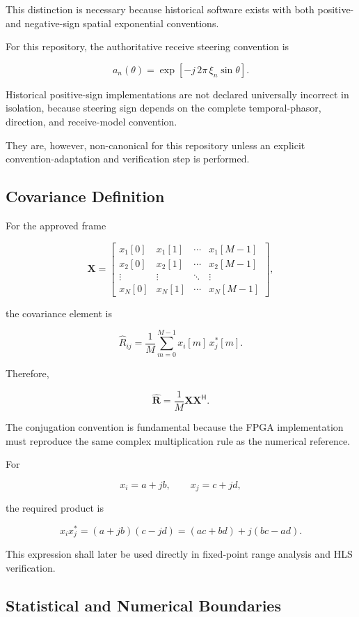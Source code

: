 This distinction is necessary because historical software exists with both
positive- and negative-sign spatial exponential conventions.

For this repository, the authoritative receive steering convention is

\[
a_n(\theta)
=
\exp\!\left[
-j\,2\pi\,\xi_n\sin\theta
\right].
\]

Historical positive-sign implementations are not declared universally
incorrect in isolation, because steering sign depends on the complete
temporal-phasor, direction, and receive-model convention.

They are, however, non-canonical for this repository unless an explicit
convention-adaptation and verification step is performed.
\subsection{Covariance Definition}

For the approved frame

\[
\mathbf X
=
\begin{bmatrix}
x_1[0] & x_1[1] & \cdots & x_1[M-1] \\
x_2[0] & x_2[1] & \cdots & x_2[M-1] \\
\vdots & \vdots & \ddots & \vdots \\
x_N[0] & x_N[1] & \cdots & x_N[M-1]
\end{bmatrix},
\]

the covariance element is

\[
\widehat R_{ij}
=
\frac{1}{M}
\sum_{m=0}^{M-1}
x_i[m]\,x_j^{*}[m].
\]

Therefore,

\[
\widehat{\mathbf R}
=
\frac{1}{M}
\mathbf X\mathbf X^{\mathsf H}.
\]

The conjugation convention is fundamental because the FPGA implementation
must reproduce the same complex multiplication rule as the numerical
reference.

For

\[
x_i = a + jb,
\qquad
x_j = c + jd,
\]

the required product is

\[
x_i x_j^{*}
=
(a+jb)(c-jd)
=
(ac+bd)
+
j(bc-ad).
\]

This expression shall later be used directly in fixed-point range analysis
and HLS verification.

\subsection{Statistical and Numerical Boundaries}

